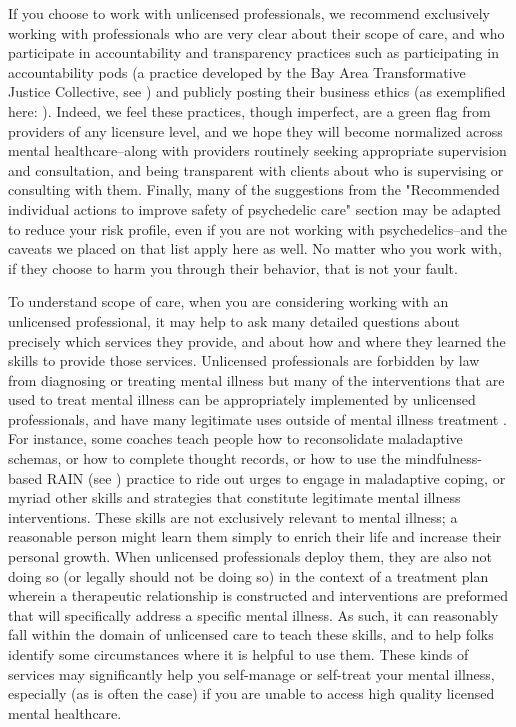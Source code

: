 \documentclass[12pt,letterpaper]{book}
\begin{document}
If you choose to work with unlicensed professionals, we recommend exclusively working with professionals who are very clear about their scope of care, and who participate in accountability and transparency practices such as participating in accountability pods (a practice developed by the Bay Area Transformative Justice Collective, see \textcite{podmapping}) and publicly posting their business ethics (as exemplified here: \textcite{sinbackValues}). Indeed, we feel these practices, though imperfect, are a green flag from providers of any licensure level, and we hope they will become normalized across mental healthcare–along with providers routinely seeking appropriate supervision and consultation, and being transparent with clients about who is supervising or consulting with them. Finally, many of the suggestions from the "Recommended individual actions to improve safety of psychedelic care" section may be adapted to reduce your risk profile, even if you are not working with psychedelics–and the caveats we placed on that list apply here as well. No matter who you work with, if they choose to harm you through their behavior, that is not your fault.

To understand scope of care, when you are considering working with an unlicensed professional, it may help to ask many detailed questions about precisely which services they provide, and about how and where they learned the skills to provide those services. Unlicensed professionals are forbidden by law from diagnosing or treating mental illness but many of the interventions that are used to treat mental illness can be appropriately implemented by unlicensed professionals, and have many legitimate uses outside of mental illness treatment \cite{aboujaoude2020coachingVSTherapy,healthyGamerCoaching}. For instance, some coaches teach people how to reconsolidate maladaptive schemas, or how to complete thought records, or how to use the mindfulness-based RAIN (see \textcite{rain}) practice to ride out urges to engage in maladaptive coping, or myriad other skills and strategies that constitute legitimate mental illness interventions. These skills are not exclusively relevant to mental illness; a reasonable person might learn them simply to enrich their life and increase their personal growth. When unlicensed professionals deploy them, they are also not doing so (or legally should not be doing so) in the context of a treatment plan wherein a therapeutic relationship is constructed and interventions are preformed that will specifically address a specific mental illness. As such, it can reasonably fall within the domain of unlicensed care to teach these skills, and to help folks identify some circumstances where it is helpful to use them. These kinds of services may significantly help you self-manage or self-treat your mental illness, especially (as is often the case) if you are unable to access high quality licensed mental healthcare.
\end{document}
